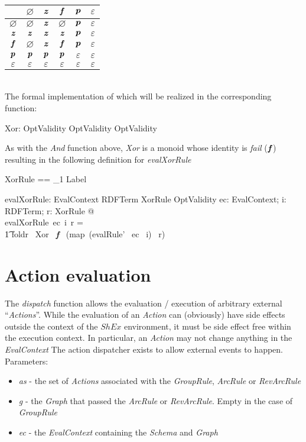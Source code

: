 \documentclass[fuzz]{llncs}
\def\pass{\textbf{\textit{p}}}
\def\fail{\textbf{\textit{f}}}
\def\dunno{\varnothing}
\def\error{\varepsilon}
\def\nomatch{\textbf{\textit{z}}}
\def\zc{\textit}
\def\zcb{\textit{\textbf}}
\begin{document}
\begin{tabular}{c || c | c | c | c | c |}
   \hline
   \zcb{Xor} & $\dunno$ & $\nomatch$ & $\fail$ & $\pass$ & $\error$ \\
   \hline \hline
   $\dunno$ & $\dunno$ & $\nomatch$ & $\dunno$ & $\pass$ & $\error$ \\ \hline
   $\nomatch$ & $\nomatch$ & $\nomatch$ & $\nomatch$ & $\pass$ & $\error$ \\ \hline
   $\fail$ & $\dunno$ & $\nomatch$ & $\fail$ & $\pass$ & $\error$ \\ \hline
   $\pass$ & $\pass$ & $\pass$ & $\pass$ & $\error$ & $\error$ \\ \hline
   $\error$ & $\error$ & $\error$ & $\error$ & $\error$ & $\error$ \\ \hline 
\end{tabular}
\\
The formal implementation of which will be realized in the corresponding function:
\begin{gendef}
   Xor: OptValidity \fun OptValidity \fun OptValidity
\end{gendef}
As with the \zc{And} function above, \zc{Xor} is a monoid whose identity is \zc{fail} ($\fail$)
resulting in the following definition for \zc{evalXorRule}
\begin{zed}
XorRule == \seq_1 Label
\end{zed}
\begin{gendef}
   evalXorRule: EvalContext \fun RDFTerm \fun XorRule \fun OptValidity
\where
   \forall ec: EvalContext; i: RDFTerm; r: XorRule  @ \\
	evalXorRule~ec~i~r = \\
\t1	foldr~ Xor~ \fail ~ (map~(evalRule'~ ec ~i)~ r)
\end{gendef}



\section{Action evaluation}
The \zc{dispatch} function allows the evaluation / execution of arbitrary external ``\zc{Actions}''.  While the evaluation of an \zc{Action} can (obviously) have side effects
outside the context of the $ShEx$ environment, it must be side effect free within the 
execution context.  In particular, an \zc{Action} may not change anything in the 
\zc{EvalContext} 
The action dispatcher exists to allow external events to happen. Parameters:
\begin{itemize}
\item \zc{as} - the set of \zc{Actions} associated with the \zc{GroupRule}, \zc{ArcRule} or \zc{RevArcRule} 
\item \zc{g} - the \zc{Graph} that passed the \zc{ArcRule} or \zc{RevArcRule}.  Empty in the case of \zc{GroupRule}
\item \zc{ec} - the \zc{EvalContext} containing the \zc{Schema} and \zc{Graph}

\end{itemize}
\end{document}
